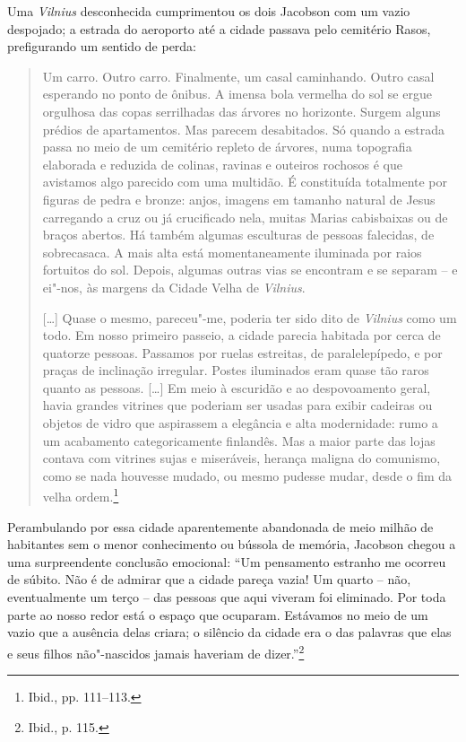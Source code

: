 Uma \textit{Vilnius} desconhecida cumprimentou os dois Jacobson com um vazio
despojado; a estrada do aeroporto até a cidade passava pelo cemitério
Rasos, prefigurando um sentido de perda:

\begin{quote}
Um carro. Outro carro. Finalmente, um casal caminhando. Outro casal
esperando no ponto de ônibus. A imensa bola vermelha do sol se ergue
orgulhosa das copas serrilhadas das árvores no horizonte. Surgem alguns
prédios de apartamentos. Mas parecem desabitados. Só quando a estrada
passa no meio de um cemitério repleto de árvores, numa topografia
elaborada e reduzida de colinas, ravinas e outeiros rochosos é que
avistamos algo parecido com uma multidão. É constituída totalmente por
figuras de pedra e bronze: anjos, imagens em tamanho natural de Jesus
carregando a cruz ou já crucificado nela, muitas Marias cabisbaixas ou
de braços abertos. Há também algumas esculturas de pessoas falecidas, de
sobrecasaca. A mais alta está momentaneamente iluminada por raios
fortuitos do sol. Depois, algumas outras vias se encontram e se separam
-- e ei"-nos, às margens da Cidade Velha de \textit{Vilnius}.

[\ldots{}] Quase o mesmo, pareceu"-me, poderia ter sido dito de \textit{Vilnius} como
um todo. Em nosso primeiro passeio, a cidade parecia habitada por cerca
de quatorze pessoas. Passamos por ruelas estreitas, de paralelepípedo, e
por praças de inclinação irregular. Postes iluminados eram quase tão
raros quanto as pessoas. [\ldots{}] Em meio à escuridão e ao despovoamento
geral, havia grandes vitrines que poderiam ser usadas para exibir
cadeiras ou objetos de vidro que aspirassem a elegância e alta
modernidade: rumo a um acabamento categoricamente finlandês. Mas a maior
parte das lojas contava com vitrines sujas e miseráveis, herança maligna
do comunismo, como se nada houvesse mudado, ou mesmo pudesse mudar,
desde o fim da velha ordem.\footnote{Ibid., pp. 111--113.}
\end{quote}

Perambulando por essa cidade aparentemente abandonada de meio milhão de
habitantes sem o menor conhecimento ou bússola de memória, Jacobson
chegou a uma surpreendente conclusão emocional: ``Um pensamento estranho
me ocorreu de súbito. Não é de admirar que a cidade pareça vazia! Um
quarto -- não, eventualmente um terço -- das pessoas que aqui viveram foi
eliminado. Por toda parte ao nosso redor está o espaço que ocuparam.
Estávamos no meio de um vazio que a ausência delas criara; o silêncio da
cidade era o das palavras que elas e seus filhos não"-nascidos jamais
haveriam de dizer.''\footnote{Ibid., p. 115.}

